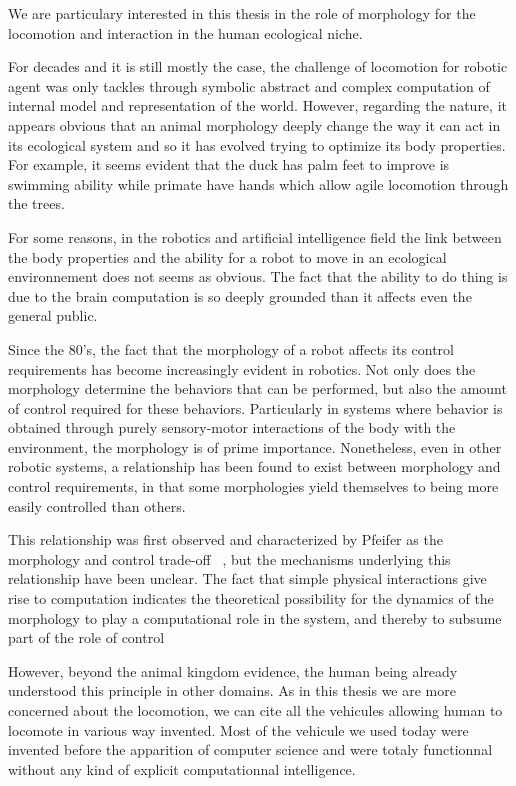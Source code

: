We are particulary interested in this thesis in the role of morphology for the locomotion and interaction in the human ecological niche.

For decades and it is still mostly the case, the challenge of locomotion for robotic agent was only tackles through symbolic abstract and complex computation of internal model and representation of the world. However, regarding the nature, it appears obvious that an animal morphology deeply change the way it can act in its ecological system and so it has evolved trying to optimize its body properties. For example, it seems evident that the duck has palm feet to improve is swimming ability while primate have hands which allow agile locomotion through the trees.

For some reasons, in the robotics and artificial intelligence field the link between the body properties and the ability for a robot to move in an ecological environnement does not seems as obvious. The fact that the ability to do thing is due to the brain computation is so deeply grounded than it affects even the general public.

Since the 80's, the fact that the morphology of a robot affects its control requirements has become increasingly evident in robotics. Not only does the morphology determine the behaviors that can be performed, but also the amount of control required for these behaviors. Particularly in systems where behavior is obtained through purely sensory-motor interactions of the body with the environment, the morphology is of prime importance. Nonetheless, even in other robotic systems, a relationship has been found to exist between morphology and control requirements, in that some morphologies yield themselves to being more easily controlled than others.

This relationship was first observed and characterized by Pfeifer as the morphology and control trade-off ~\cite{pfeifer2001understanding}, but the mechanisms underlying this relationship have been unclear. The fact that simple physical interactions give rise to computation indicates the theoretical possibility for the dynamics of the morphology to play a computational role in the system, and thereby to subsume part of the role of control~\cite{paulinvestigation}

However, beyond the animal kingdom evidence, the human being already understood this principle in other domains. As in this thesis we are more concerned about the locomotion, we can cite all the vehicules allowing human to locomote in various way invented. Most of the vehicule we used today were invented before the apparition of computer science and were totaly functionnal without any kind of explicit computationnal intelligence.

